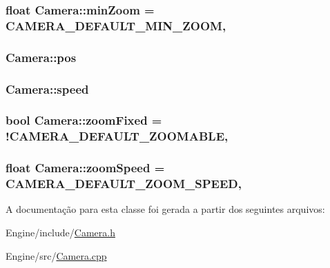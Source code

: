 \hypertarget{classCamera_a65d5a8e5533b568224d9fc488bfdcb28}{
\subsubsection[{min\+Zoom}]{\setlength{\rightskip}{0pt plus 5cm}float Camera\+::min\+Zoom = {\bf C\+A\+M\+E\+R\+A\+\_\+\+D\+E\+F\+A\+U\+L\+T\+\_\+\+M\+I\+N\+\_\+\+Z\+O\+O\+M}\hspace{0.3cm}{\ttfamily [static]}, {\ttfamily [private]}}}\label{classCamera_a65d5a8e5533b568224d9fc488bfdcb28}
\hypertarget{classCamera_a748c4e2867e34f45a431a1d2dcc6fee2}{
\subsubsection[{pos}]{ Camera\+::pos\hspace{0.3cm}{\ttfamily [static]}}}\label{classCamera_a748c4e2867e34f45a431a1d2dcc6fee2}
\hypertarget{classCamera_aa0d0a54eb56182723dbd0ce61e0b3e8d}{
\subsubsection[{speed}]{ Camera\+::speed\hspace{0.3cm}{\ttfamily [static]}}}\label{classCamera_aa0d0a54eb56182723dbd0ce61e0b3e8d}
\hypertarget{classCamera_a7f235a90f57567a0012ed8f4a52634ce}{
\subsubsection[{zoom\+Fixed}]{\setlength{\rightskip}{0pt plus 5cm}bool Camera\+::zoom\+Fixed = !{\bf C\+A\+M\+E\+R\+A\+\_\+\+D\+E\+F\+A\+U\+L\+T\+\_\+\+Z\+O\+O\+M\+A\+B\+L\+E}\hspace{0.3cm}{\ttfamily [static]}, {\ttfamily [private]}}}\label{classCamera_a7f235a90f57567a0012ed8f4a52634ce}
\hypertarget{classCamera_a7ec8dd2dcb2c3446ba88ad30e2e195d9}{
\subsubsection[{zoom\+Speed}]{\setlength{\rightskip}{0pt plus 5cm}float Camera\+::zoom\+Speed = {\bf C\+A\+M\+E\+R\+A\+\_\+\+D\+E\+F\+A\+U\+L\+T\+\_\+\+Z\+O\+O\+M\+\_\+\+S\+P\+E\+E\+D}\hspace{0.3cm}{\ttfamily [static]}, {\ttfamily [private]}}}\label{classCamera_a7ec8dd2dcb2c3446ba88ad30e2e195d9}


A documentação para esta classe foi gerada a partir dos seguintes arquivos\+:\begin{DoxyCompactItemize}
\item 
Engine/include/\hyperlink{Camera_8h}{Camera.\+h}\item 
Engine/src/\hyperlink{Camera_8cpp}{Camera.\+cpp}\end{DoxyCompactItemize}
